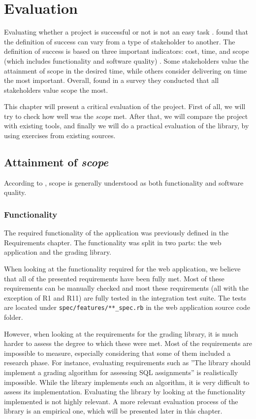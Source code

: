\chapter{Evaluation}

Evaluating whether a project is successful or not is not an easy task \citep{lit:definining_success}. \cite{lit:definining_success} found that the definition of success can vary from a type of stakeholder to another. The definition of success is based on three important indicators: cost, time, and scope (which includes functionality and software quality) \citep{lit:definining_success}. Some stakeholders value the attainment of scope in the desired time, while others consider delivering on time the most important. Overall, \cite{lit:definining_success} found in a survey they conducted that all stakeholders value scope the most.

This chapter will present a critical evaluation of the project. First of all, we will try to check how well was the \textit{scope} met. After that, we will compare the project with existing tools, and finally we will do a practical evaluation of the library, by using exercises from existing sources.

\section{Attainment of \textit{scope}}
According to \cite{lit:definining_success}, scope is generally understood as both functionality and software quality.

\subsection{Functionality}

The required functionality of the application was previously defined in the Requirements chapter. The functionality was split in two parts: the web application and the grading library.

When looking at the functionality required for the web application, we believe that all of the presented requirements have been fully met. Most of these requirements can be manually checked and most these requirements (all with the exception of R1 and R11) are fully tested in the integration test suite. The tests are located under \texttt{spec/features/**\_spec.rb} in the web application source code folder.


However, when looking at the requirements for the grading library, it is much harder to assess the degree to which these were met. Most of the requirements are impossible to measure, especially considering that some of them included a research phase. For instance, evaluating requirements such as ''The library should implement a grading algorithm for assessing SQL assignments'' is realistically impossible. While the library implements such an algorithm, it is very difficult to assess its implementation. Evaluating the library by looking at the functionality implemented is not highly relevant. A more relevant evaluation process of the library is an empirical one, which will be presented later in this chapter.

